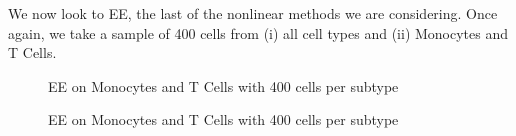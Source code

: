 \documentclass{article}
\begin{document}
We now look to EE, the last of the nonlinear methods we are considering. Once again, we take a sample of 400 cells from (i) all cell types and (ii) Monocytes and T Cells.

\begin{figure}[h]
\vskip 0.2in
\begin{center}
\quad
{}\quad
\end{center}
\caption{EE on Monocytes and T Cells with 400 cells per subtype}
\label{EEall}
\vskip -0.2in
\end{figure}


\begin{figure}[h]
\vskip 0.2in
\begin{center}
\quad
{}\quad
\end{center}
\caption{EE on Monocytes and T Cells with 400 cells per subtype}
\label{EEmonocytesandtcells}
\vskip -0.2in
\end{figure}
\end{document}
